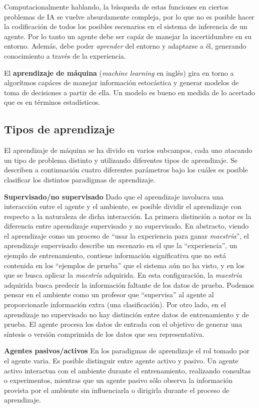 Computacionalmente hablando, la búsqueda de estas funciones en ciertos problemas de IA
se vuelve absurdamente compleja, por lo que no es posible hacer la codificación de todos
los posibles escenarios en el sistema de inferencia de un agente. Por lo tanto un agente
debe ser capáz de manejar la incertidumbre en su entorno. Además, debe poder \textit{aprender}
del entorno y adaptarse a él, generando conocimiento a través de la experiencia.

El \textbf{aprendizaje de máquina} (\textit{machine learning} en inglés) gira en torno a
algorítmos capáces de manejar información estocástica y generar modelos de toma de decisiones
a partir de ella. Un modelo es bueno en medida de lo acertado que es en términos estadísticos.

\subsection{Tipos de aprendizaje}
El aprendizaje de máquina se ha divido en varios subcampos,
cada uno atacando un tipo de problema distinto y utilizando diferentes
tipos de aprendizaje.
Se describen a continuación cuatro diferentes parámetros bajo los cuáles
es posible clasificar los distintos paradigmas de aprendizaje.

\textbf{Supervisado/no supervisado} Dado que el aprendizaje involucra
una interacción entre el agente y el ambiente, es posible
dividir el aprendizaje con respecto a la naturaleza de dicha interacción.
La primera distinción a notar es la diferencia entre aprendizaje supervisado
y no supervisado. En abstracto, viendo el aprendizaje como un proceso
de ``usar la experiencia para ganar \textit{maestría}'', el aprendizaje
supervisado describe un escenario en el que la ``experiencia'', un
ejemplo de entrenamiento, contiene información significativa que no
está contenida en los ``ejemplos de prueba'' que el sistema aún no ha
visto, y en los que se busca aplicar la \textit{maestría} adquirida.
En esta configuración, la \textit{maestría} adquirida busca
predecir la información faltante de los datos de prueba. Podemos
pensar en el ambiente como un profesor que ``supervisa'' al agente
al proporcionarle información extra (una clasificación). Por otro lado,
en el aprendizaje no supervisado no hay distinción entre datos de
entrenamiento y de prueba. El agente procesa los datos de entrada
con el objetivo de generar una síntesis o versión comprimida de los
datos que sea representativa.

\textbf{Agentes pasivos/activos} En los paradigmas de aprendizaje
el rol tomado por el agente varia. Es posible distinguir entre
agente activo y pasivo. Un agente activo interactua
con el ambiente durante el entrenamiento, realizando consultas o
experimentos, mientras que un agente pasivo sólo observa la
información provista por el ambiente sin influenciarla
o dirigirla durante el proceso de aprendizaje.

